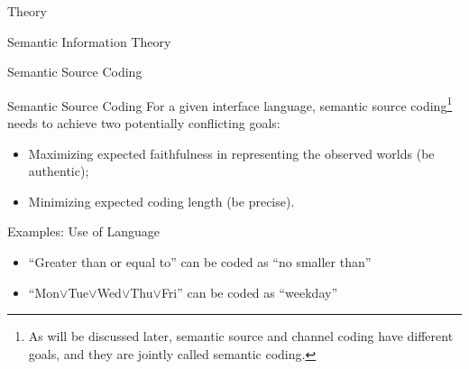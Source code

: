 \documentclass[presentation,mathserif,9pt]{beamer}
\begin{document}
\begin{section}{Theory}
\begin{subsection}{Semantic Information Theory}
		\begin{frame}{Semantic Source Coding}
			\singlespacing
			\begin{alertblock}{Semantic Source Coding}
				For a given interface language, semantic source coding\footnote[frame]{As will be discussed later, semantic source and channel coding have different goals, and they are jointly called semantic coding.} needs to achieve two potentially conflicting goals:
				\begin{itemize}
					\item Maximizing expected faithfulness in representing the observed worlds (be \alert{authentic});
					\item Minimizing expected coding length (be \alert{precise}).
				\end{itemize}
			\end{alertblock}
			\singlespacing
			\begin{exampleblock}{Examples: Use of Language}
				\begin{itemize}
					\item ``Greater than or equal to'' can be coded as ``no smaller than''
					\item ``Mon$\vee$Tue$\vee$Wed$\vee$Thu$\vee$Fri'' can be coded as ``weekday''
				\end{itemize}
			\end{exampleblock}
		\end{frame}


\end{subsection}
\end{section}
\end{document}
